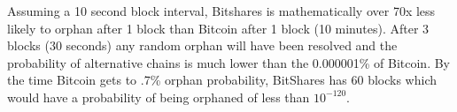 Assuming a 10 second block interval, Bitshares is mathematically over 70x less
likely to orphan after 1 block than Bitcoin after 1 block (10 minutes). After 3
blocks (30 seconds) any random orphan will have been resolved and the
probability of alternative chains is much lower than the 0.000001\% of Bitcoin.
By the time Bitcoin gets to .7\% orphan probability, BitShares has 60 blocks
which would have a probability of being orphaned of less than $10^{-120}$.

